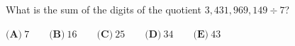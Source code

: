 What is the sum of the digits of the quotient $3{,}431{,}969{,}149\div7$?

$\textbf{(A)}\ 7\qquad\textbf{(B)}\ 16\qquad\textbf{(C)}\ 25\qquad\textbf{(D)}\ 34\qquad\textbf{(E)}\ 43$
